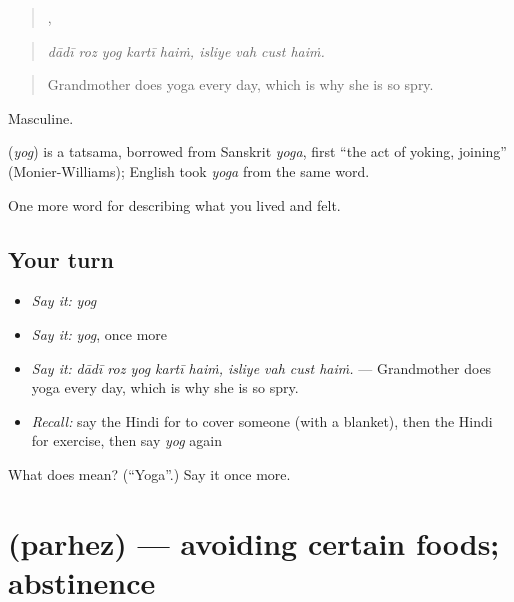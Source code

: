 \begin{quote}
    ,    
\end{quote}

\begin{quote}
\emph{dādī roz yog kartī haiṁ, isliye vah cust haiṁ.}
\end{quote}

\begin{quote}
Grandmother does yoga every day, which is why she is so spry.
\end{quote}

Masculine.

\begin{cousinweb}
\textbf{} (\emph{yog}) is a tatsama, borrowed from Sanskrit \emph{yoga}, first \textquotedblleft{}the act of yoking, joining\textquotedblright{} (Monier-Williams); English took \emph{yoga} from the same word.
\end{cousinweb}

\begin{grammarlens}[title={What you've built}]
One more word for describing what you lived and felt.
\end{grammarlens}

\subsection*{Your turn}
\begin{itemize}
\raggedright
  \item \emph{Say it:} \emph{yog}
  \item \emph{Say it:} \emph{yog}, once more
  \item \emph{Say it:} \emph{dādī roz yog kartī haiṁ, isliye vah cust haiṁ.} — Grandmother does yoga every day, which is why she is so spry.
  \item \emph{Recall:} say the Hindi for to cover someone (with a blanket), then the Hindi for exercise, then say \emph{yog} again
\end{itemize}

\begin{tcolorbox}[breakable,colback=teal!4,colframe=teal!35!black,title={Before you move on}]
What does  mean? (\textquotedblleft{}Yoga\textquotedblright{}.) Say it once more.
\end{tcolorbox}
\section[\texorpdfstring{\hi{परहेज़} (parhez)}{परहेज़ (parhez)}]{ (parhez) — avoiding certain foods; abstinence}

